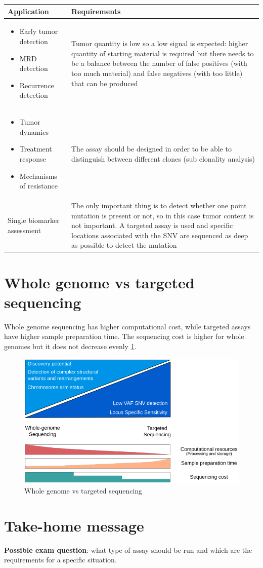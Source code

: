 \begin{tabular}{ | m{5cm}| m{9cm} | }
 \hline
 \textbf{Application} & \textbf{Requirements} \\
 \hline
 \begin{itemize}
     \item Early tumor detection
     \item MRD detection
     \item Recurrence detection
 \end{itemize} & Tumor quantity is low so a low signal is expected: higher quantity of starting material is required but there needs to be a balance between the number of false positives (with too much material) and false negatives (with too little) that can be produced \\
 \hline
 \begin{itemize}
     \item Tumor dynamics
     \item Treatment response
     \item Mechanisms of resistance
 \end{itemize} & The assay should be designed in order to be able to distinguish between different clones (sub clonality analysis) \\
 \hline
 Single biomarker assessment & The only important thing is to detect whether one point mutation is present or not, so in this case tumor content is not important. A targeted assay is used and specific locations associated with the SNV are sequenced as deep as possible to detect the mutation \\
 \hline
\end{tabular}

\section{Whole genome vs targeted sequencing}
Whole genome sequencing has higher computational cost, while targeted assays have higher sample preparation time. The sequencing cost is higher for whole genomes but it does not decrease evenly \ref{fig:wg}.

\begin{figure}[!ht]
\centering
    \includegraphics[width=0.7\linewidth]{wg.png}
    \caption{\label{fig:wg}Whole genome vs targeted sequencing}
\end{figure}


\section{Take-home message}
\textbf{Possible exam question}: what type of assay should be run and which are the requirements for a specific situation.\\

